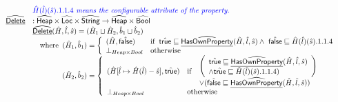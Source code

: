 \[\begin{array}{ll}
& {\color{blue} \hat{H}(\hat{l})(\hat{s}).1.1.4\textit{ means the configurable attribute of the property.}} \\
\widehat{\underline{\sf Delete}} & : \widehat{\mbox{\textsf{Heap}}} \times \widehat{\mbox{\textsf{Loc}}} \times \widehat{\mbox{\textsf{String}}} \rightarrow \widehat{\mbox{\textsf{Heap}}}
\times \widehat{\mbox{\textsf{Bool}}}\\
& \widehat{\underline{\sf Delete}}(\hat{H},\hat{l},\hat{s})
  = (\hat{H}_1\sqcup\hat{H}_2,\hat{b}_1\sqcup\hat{b}_2)\\
&  \quad{\rm where}\begin{array}[t]{l}
    (\hat{H}_1,\hat{b}_1) = \left\{
      \begin{array}{ll}
        (\hat{H},\hat{\mbox{\textsf{false}}})
        & {\rm if}\begin{array}[t]{l}\hat{\mbox{\textsf{true}}}\sqsubseteq\widehat{\underline{\sf HasOwnProperty}}(\hat{H},\hat{l},\hat{s})
          \land\ \hat{\mbox{\textsf{false}}}\sqsubseteq\hat{H}(\hat{l})(\hat{s}).1.1.4\end{array}\\
        \bot_{Heap\times Bool} & {\rm otherwise} \\
      \end{array}
    \right.\\
    (\hat{H}_2,\hat{b}_2) = \left\{
      \begin{array}{ll}
        (\hat{H}[\hat{l}\mapsto \hat{H}(\hat{l}) - \hat{s}],\hat{\mbox{\textsf{true}}})
        & {\rm if}\begin{array}[t]{l}
          \begin{array}{l}
            \left(
              \begin{array}{l}
              \hat{\mbox{\textsf{true}}} \sqsubseteq\widehat{\underline{\sf HasOwnProperty}}(\hat{H},\hat{l},\hat{s})\\
              \land \hat{\mbox{\textsf{true}}}\sqsubseteq\hat{H}(\hat{l})(\hat{s}).1.1.4)
              \end{array}
            \right)\\
            \vee (\hat{\mbox{\textsf{false}}}\sqsubseteq\widehat{\underline{\sf HasOwnProperty}}(\hat{H},\hat{l},\hat{s}))
          \end{array}\end{array}\\
        \bot_{Heap\times Bool} & {\rm otherwise} \\
      \end{array}
    \right.\\
  \end{array}\\
\\
\end{array}
\]

